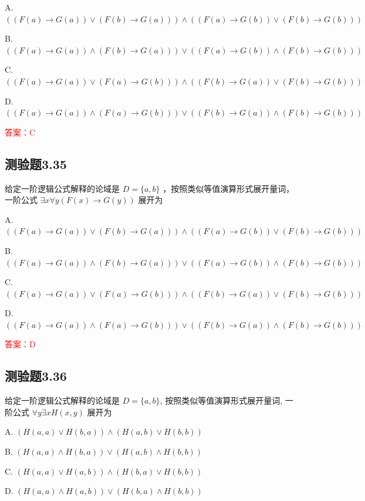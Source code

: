 \documentclass[UTF8, heading=true]{ctexart}
\begin{document}
A. $((F(a) \rightarrow G(a)) \vee(F(b) \rightarrow G(a))) \wedge((F(a) \rightarrow G(b)) \vee(F(b) \rightarrow G(b)))$

B. $((F(a) \rightarrow G(a)) \wedge(F(b) \rightarrow G(a))) \vee((F(a) \rightarrow G(b)) \wedge(F(b) \rightarrow G(b)))$

C. $((F(a) \rightarrow G(a)) \vee(F(a) \rightarrow G(b))) \wedge((F(b) \rightarrow G(a)) \vee(F(b) \rightarrow G(b)))$

D. $((F(a) \rightarrow G(a)) \wedge(F(a) \rightarrow G(b))) \vee((F(b) \rightarrow G(a)) \wedge(F(b) \rightarrow G(b)))$

\textcolor{red}{答案：C}

\subsection{测验题3.35}

给定一阶逻辑公式解释的论域是 $D=\{a, b\}$ ，按照类似等值演算形式展开量词，一阶公式 $\exists x \forall y(F(x) \rightarrow G(y))$ 展开为 $\qquad$

A. $
((F(a) \rightarrow G(a)) \vee(F(b) \rightarrow G(a))) \wedge((F(a) \rightarrow G(b)) \vee(F(b) \rightarrow G(b)))
$


B. $
((F(a) \rightarrow G(a)) \wedge(F(b) \rightarrow G(a))) \vee((F(a) \rightarrow G(b)) \wedge(F(b) \rightarrow G(b)))
$


C. $
((F(a) \rightarrow G(a)) \vee(F(a) \rightarrow G(b))) \wedge((F(b) \rightarrow G(a)) \vee(F(b) \rightarrow G(b)))
$


D. $
((F(a) \rightarrow G(a)) \wedge(F(a) \rightarrow G(b))) \vee((F(b) \rightarrow G(a)) \wedge(F(b) \rightarrow G(b)))
$


\textcolor{red}{答案：D}


\subsection{测验题3.36}

给定一阶逻辑公式解释的论域是 $D=\{a, b\}$, 按照类似等值演算形式展开量词, 一阶公式 $\forall y \exists x H(x, y)$ 展开为 $\qquad$

A. $(H(a, a) \vee H(b, a)) \wedge(H(a, b) \vee H(b, b))$

B. $(H(a, a) \wedge H(b, a)) \vee(H(a, b) \wedge H(b, b))$

C. $(H(a, a) \vee H(a, b)) \wedge(H(b, a) \vee H(b, b))$

D. $(H(a, a) \wedge H(a, b)) \vee(H(b, a) \wedge H(b, b))$
\end{document}
